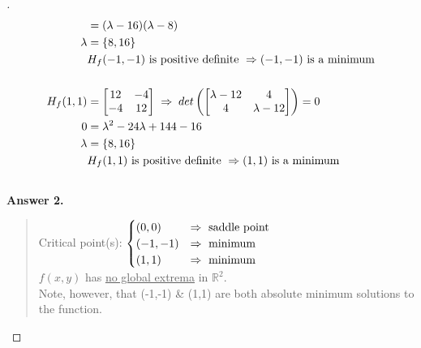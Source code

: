 \documentclass[12pt]{article}
\begin{document}
\begin{proof}[]
\begin{align*}
		 &= (\lambda - 16) (\lambda - 8) \\
		\lambda &= \left\lbrace 8, 16 \right\rbrace \\
		& H_f(-1, -1) \textnormal{ is positive definite } \Rightarrow (-1, -1) \textnormal{ is a minimum} \\[15pt]
		H_f(1, 1) &= \begin{bmatrix} 12 & -4 \\ -4 & 12 \end{bmatrix} \; \Rightarrow \; det\left( \begin{bmatrix} \lambda - 12 & 4 \\ 4 & \lambda - 12 \end{bmatrix} \right) = 0 \\
		0 &= \lambda^2  - 24 \lambda + 144 - 16 \\
		\lambda &= \left\lbrace 8, 16 \right\rbrace \\
		& H_f(1, 1) \textnormal{ is positive definite } \Rightarrow (1, 1) \textnormal{ is a minimum} \\[15pt]
	\end{align*} \vspace{-5mm}
	\textbf{Answer 2.} \vspace{-5mm} \\
	\begin{quote}
		Critical point(s): $ \begin{cases}
		(0,0) & \Rightarrow \textnormal{ saddle point} \\
		(-1, -1) & \Rightarrow \textnormal{ minimum} \\
		(1, 1) & \Rightarrow \textnormal{ minimum}
	\end{cases}	$ \\
		$f(x,y)$ has \underline{no global extrema} in $\mathbb{R}^2$. \\
		Note, however, that (-1,-1) \& (1,1) are both absolute minimum solutions to the function.
	\end{quote}
\end{proof}
\end{document}
